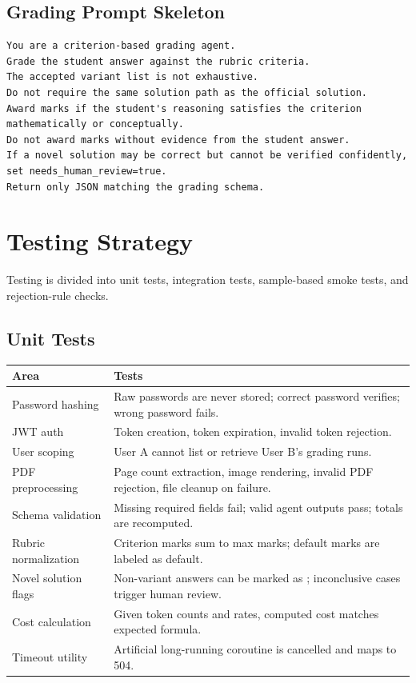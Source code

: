 \documentclass[11pt,a4paper]{article}
\newcommand{\code}[1]{\texttt{\detokenize{#1}}}
\begin{document}
\subsection{Grading Prompt Skeleton}

\begin{lstlisting}
You are a criterion-based grading agent.
Grade the student answer against the rubric criteria.
The accepted variant list is not exhaustive.
Do not require the same solution path as the official solution.
Award marks if the student's reasoning satisfies the criterion mathematically or conceptually.
Do not award marks without evidence from the student answer.
If a novel solution may be correct but cannot be verified confidently, set needs_human_review=true.
Return only JSON matching the grading schema.
\end{lstlisting}

\section{Testing Strategy}

Testing is divided into unit tests, integration tests, sample-based smoke tests, and rejection-rule checks.

\subsection{Unit Tests}

\begin{longtable}{p{}p{}}
\toprule
\textbf{Area} & \textbf{Tests} \\
\midrule
Password hashing & Raw passwords are never stored; correct password verifies; wrong password fails. \\
JWT auth & Token creation, token expiration, invalid token rejection. \\
User scoping & User A cannot list or retrieve User B's grading runs. \\
PDF preprocessing & Page count extraction, image rendering, invalid PDF rejection, file cleanup on failure. \\
Schema validation & Missing required fields fail; valid agent outputs pass; totals are recomputed. \\
Rubric normalization & Criterion marks sum to max marks; default marks are labeled as default. \\
Novel solution flags & Non-variant answers can be marked as \code{novel_valid_solution}; inconclusive cases trigger human review. \\
Cost calculation & Given token counts and rates, computed cost matches expected formula. \\
Timeout utility & Artificial long-running coroutine is cancelled and maps to 504. \\
\bottomrule
\end{longtable}
\end{document}

